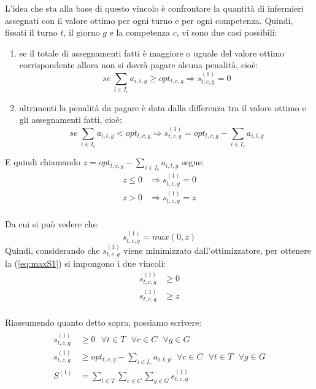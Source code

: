 L'idea che sta alla base di questo vincolo è confrontare la quantità di infermieri assegnati con il valore ottimo per ogni turno e per ogni competenza.
Quindi, fissati il turno $t$, il giorno $g$ e la competenza $c$, vi sono due casi possibili:
\begin{enumerate}
\item se il totale di assegnamenti fatti è maggiore o uguale del valore ottimo corrispondente allora non si dovrà pagare alcuna penalità, cioè:
\begin{equation}
se ~ \sum_{i \in I_c} a_{i, t, g} \geq opt_{t,c,g} \Longrightarrow s^{(1)}_{t, c, g} = 0
\end{equation}
\item altrimenti la penalità da pagare è data dalla differenza tra il valore ottimo e gli assegnamenti fatti, cioè: 
\begin{equation}
se ~ \sum_{i \in I_c} a_{i, t, g} < opt_{t,c,g} \Longrightarrow s^{(1)}_{t, c, g} = opt_{t,c,g} - \sum_{i \in I_c} a_{i, t, g}
\end{equation}
\end{enumerate}

E quindi chiamando $z = opt_{t,c,g} - \sum_{i \in I_c} a_{i, t, g}$ segue:
\begin{equation}
\begin{split}
z \leq 0 &\Longrightarrow s^{(1)}_{t, c, g} = 0 \\
z > 0 &\Longrightarrow s^{(1)}_{t, c, g} = z \\
\end{split}
\end{equation}

Da cui si può vedere che:
\begin{equation}
\label{eq:maxS1}
s^{(1)}_{t, c, g} = max(0, z)
\end{equation}
Quindi, considerando che $s^{(1)}_{t, c, g}$ viene minimizzato dall'ottimizzatore, per ottenere la (\ref{eq:maxS1}) si impongono i due vincoli:
\begin{equation}
\begin{split}
s^{(1)}_{t, c, g} &\geq 0 \\
s^{(1)}_{t, c, g} &\geq z \\
\end{split}
\end{equation}

Riassumendo quanto detto sopra, possiamo scrivere:
\begin{gather}
\begin{aligned}
s^{(1)}_{t, c, g} &\geq 0 ~~~ \forall t \in T ~~~ \forall c \in C ~~~ \forall g \in G \\
s^{(1)}_{t, c, g} &\geq opt_{t,c,g} - \sum_{i \in I_c} a_{i, t, g} ~~~ \forall c \in C ~~~ \forall t \in T ~~~ \forall g \in G \\
S^{(1)}  &=  \sum_{t \in T} \sum_{c \in C} \sum_{g \in G} s^{(1)}_{t, c, g} \\
\end{aligned}
\end{gather}

